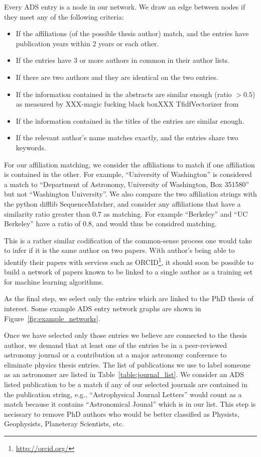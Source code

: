 \documentclass{emulateapj}
\begin{document}
Every ADS entry is a node in our network. We draw an edge between nodes if they meet any of the following criteria:

\begin{itemize}
\item{If the affiliations (of the possible thesis author) match, and the entries have publication years within 2 years or each other.}
\item{If the entries have 3 or more authors in common in their author lists.}
\item{If there are two authors and they are identical on the two entries.}
\item{If the information contained in the abstracts are similar enough (ratio $> 0.5$) as measured by XXX-magic fucking black boxXXX TfidfVectorizer from \citet{scikit-learn}}
\item{If the information contained in the titles of the entries are similar enough.}
  \item{If the relevant author's name matches exactly, and the entries share two keywords.}
\end{itemize}

For our affiliation matching, we consider the affiliations to match if one affiliation is contained in the other.  For example, ``University of Washington'' is considered a match to ``Department of Astronomy, University of Washington, Box 351580'' but not ``Washington University''.  We also compare the two affiliation strings with the python difflib SequenceMatcher, and consider any affiliations that have a similarity ratio greater than 0.7 as matching.  For example ``Berkeley'' and ``UC Berkeley'' have a ratio of 0.8, and would thus be considred matching.

This is a rather similar codification of the common-sense process one would take to infer if it is the same author on two papers. With author's being able to identify their papers with services such as ORCID\footnote{\url{http://orcid.org/}}, it should soon be possible to build a network of papers known to be linked to a single author as a training set for machine learning algorithms.  

As the final step, we select only the entries which are linked to the PhD thesis of interest.  Some example ADS entry network graphs are shown in Figure~\ref{fig:example_networks}.

Once we have selected only those entries we believe are connected to the thesis author, we demand that at least one of the entries be in a peer-reviewed astronomy journal or a contribution at a major astronomy conference to eliminate physics thesis entries.  The list of publications we use to label someone as an astronomer are listed in Table~\ref{table:journal_list}. We consider an ADS listed publication to be a match if any of our selected journals are contained in the publication string, e.g., ``Astrophysical Journal Letters'' would count as a match because it contains ``Astronomical Jounal'' which is in our list.  This step is necissary to remove PhD authors who would be better classified as Physists, Geophysists, Planeteray Scientists, etc. 
\end{document}
